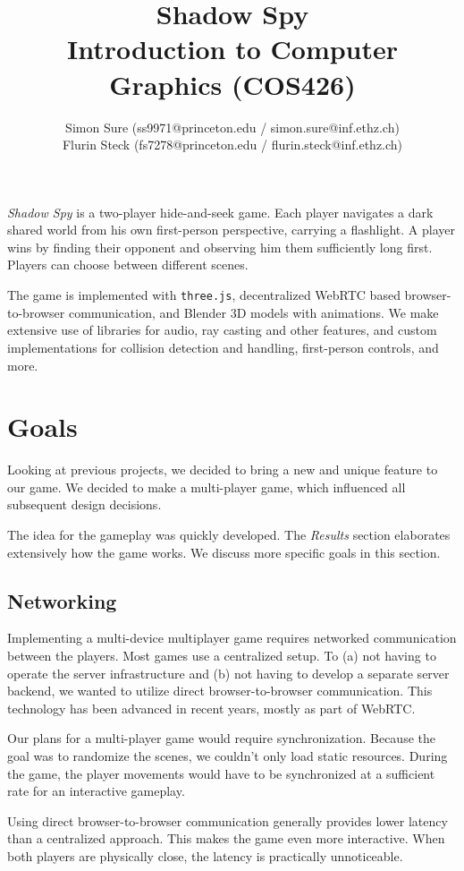 \documentclass[11pt]{article}
\title{Shadow Spy\\Introduction to Computer Graphics (COS426)}
\author{Simon Sure (ss9971@princeton.edu / simon.sure@inf.ethz.ch)\\
        Flurin Steck (fs7278@princeton.edu / flurin.steck@inf.ethz.ch)}
\begin{document}
\maketitle
\textit{Shadow Spy} is a two-player hide-and-seek game. Each player navigates a dark shared world from his own first-person perspective, carrying a flashlight. A player wins by finding their opponent and observing him them sufficiently long first. Players can choose between different scenes.
\par The game is implemented with \texttt{three.js}, decentralized WebRTC based browser-to-browser communication, and Blender 3D models with animations. We make extensive use of libraries for audio, ray casting and other features, and custom implementations for collision detection and handling, first-person controls, and more.






\section{Goals}
\par Looking at previous projects, we decided to bring a new and unique feature to our game. We decided to make a multi-player game, which influenced all subsequent design decisions.
\par The idea for the gameplay was quickly developed. The \textit{Results} section elaborates extensively how the game works. We discuss more specific goals in this section.

\subsection{Networking}
\par Implementing a multi-device multiplayer game requires networked communication between the players. Most games use a centralized setup. To (a) not having to operate the server infrastructure and (b) not having to develop a separate server backend, we wanted to utilize direct browser-to-browser communication. This technology has been advanced in recent years, mostly as part of WebRTC.
\par Our plans for a multi-player game would require synchronization. Because the goal was to randomize the scenes, we couldn't only load static resources. During the game, the player movements would have to be synchronized at a sufficient rate for an interactive gameplay.
\par Using direct browser-to-browser communication generally provides lower latency than a centralized approach. This makes the game even more interactive. When both players are physically close, the latency is practically unnoticeable.
\end{document}

